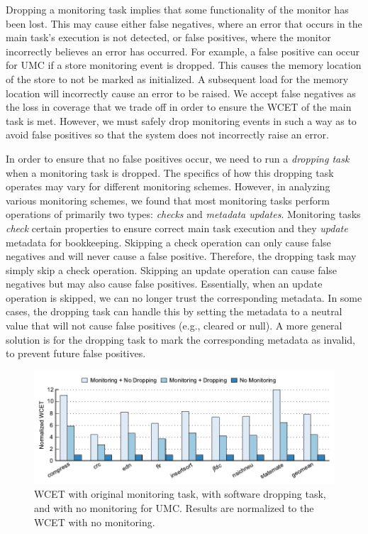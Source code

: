 Dropping a monitoring task implies that some functionality of the monitor has
been lost.  This may cause either false negatives, where an error that occurs
in the main task's execution is not detected, or false positives, where the
monitor incorrectly believes an error has occurred.  For example, a false
positive can occur for UMC if a store monitoring event is dropped. This causes
the memory location of the store to not be marked as initialized. A subsequent
load for the memory location will incorrectly cause an error to be raised.  We
accept false negatives as the loss in coverage that we trade off in order to
ensure the WCET of the main task is met. However, we must safely drop
monitoring events in such a way as to avoid false positives so that the system
does not incorrectly raise an error.

In order to ensure that no false positives occur, we need to run a
\emph{dropping task} when a monitoring task is dropped.  The specifics of how
this dropping task operates may vary for different monitoring schemes. However,
in analyzing various monitoring schemes, we found that most monitoring tasks
perform operations of primarily two types: \emph{checks} and \emph{metadata
updates}. Monitoring tasks \emph{check} certain properties to ensure correct
main task execution and they \emph{update} metadata for bookkeeping. Skipping a
check operation can only cause false negatives and will never cause a false
positive. Therefore, the dropping task may simply skip a check operation.
Skipping an update operation can cause false negatives but may also cause false
positives.  Essentially, when an update operation is skipped, we can no longer
trust the corresponding metadata. In some cases, the dropping task can handle
this by setting the metadata to a neutral value that will not cause false
positives (e.g., cleared or null). A more general solution is for the dropping
task to mark the corresponding metadata as invalid, to prevent future false
positives.

\begin{figure}
  \begin{center}
    \includegraphics{monitoring_hard_drop/data/sw_drop_wcet.pdf}
    \caption{WCET with original monitoring task, with software dropping task,
    and with no monitoring for UMC. Results are normalized to the WCET with no
    monitoring.}
    \label{fig:monitoring_hard_drop.drop.sw_dropwcet} 
  \end{center}
\end{figure}

